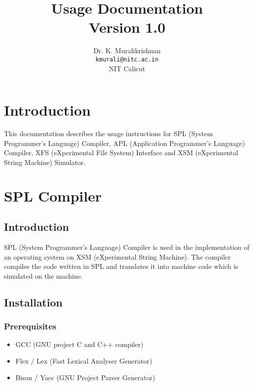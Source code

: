 \documentclass[11pt]{report}
\title{Usage Documentation \\
Version 1.0}
\author{Dr. K. Muralikrishnan  \\ \texttt{kmurali@nitc.ac.in} \\ {NIT Calicut} }
\begin{document}
\maketitle
\pagebreak

\thispagestyle{plain}

\tableofcontents
\pagebreak




\chapter{Introduction}
This documentation describes the usage instructions for SPL (System Programmer's Language) Compiler, APL (Application Programmer's Language) Compiler, XFS (eXperimental File System) Interface and XSM (eXperimental String Machine) Simulator.


\chapter{SPL Compiler}

\section{Introduction}
SPL (System Programmer's Language) Compiler is used in the implementation of an operating system on XSM (eXperimental String Machine). The compiler compiles the code written in SPL and translates it into machine code which is simulated on the machine.

\section{Installation}

\subsection{Prerequisites}
\begin{itemize}
	\item GCC  (GNU project C and C++ compiler)
	\item Flex / Lex  (Fast Lexical Analyser Generator)
	\item Bison / Yacc  (GNU Project Parser Generator)
\end{itemize} 

\end{document}
